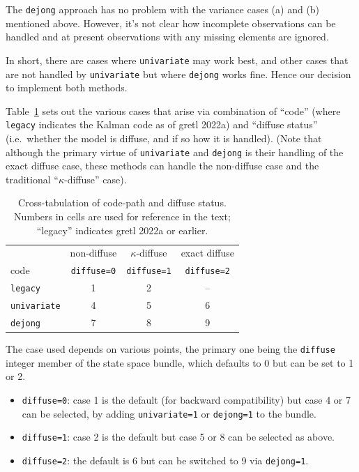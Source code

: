 The \texttt{dejong} approach has no problem with the variance cases
(a) and (b) mentioned above. However, it's not clear how incomplete
observations can be handled and at present observations with any
missing elements are ignored.

In short, there are cases where \texttt{univariate} may work best, and
other cases that are not handled by \texttt{univariate} but where
\texttt{dejong} works fine. Hence our decision to implement both
methods.

Table~\ref{tab:code-diffuse} sets out the various cases that arise via
combination of ``code'' (where \texttt{legacy} indicates the Kalman
code as of gretl 2022a) and ``diffuse status'' (i.e.\ whether the
model is diffuse, and if so how it is handled). (Note that although
the primary virtue of \texttt{univariate} and \texttt{dejong} is their
handling of the exact diffuse case, these methods can handle the
non-diffuse case and the traditional ``$\kappa$-diffuse'' case).

\begin{table}[htbp]
\begin{center}
\begin{tabular}{lccc}
   & non-diffuse & $\kappa$-diffuse & exact diffuse \\
  code & \texttt{diffuse=0} & \texttt{diffuse=1} & \texttt{diffuse=2} \\[4pt]
  \texttt{legacy} & 1 & 2 & -- \\
  \texttt{univariate} & 4 & 5 & 6 \\
  \texttt{dejong} & 7 & 8 & 9
\end{tabular}
\caption{Cross-tabulation of code-path and diffuse status. Numbers in
  cells are used for reference in the text; ``legacy'' indicates gretl
  2022a or earlier.}
\label{tab:code-diffuse}
\end{center}
\end{table}

The case used depends on various points, the primary one being the
\texttt{diffuse} integer member of the state space bundle, which
defaults to 0 but can be set to 1 or 2.
\begin{itemize}
\item \texttt{diffuse=0}: case 1 is the default (for backward
  compatibility) but case 4 or 7 can be selected, by adding
  \texttt{univariate=1} or \texttt{dejong=1} to the bundle.
\item \texttt{diffuse=1}: case 2 is the default but case
  5 or 8 can be selected as above.
\item \texttt{diffuse=2}: the default is 6 but can be switched to 9
  via \texttt{dejong=1}.
\end{itemize}


